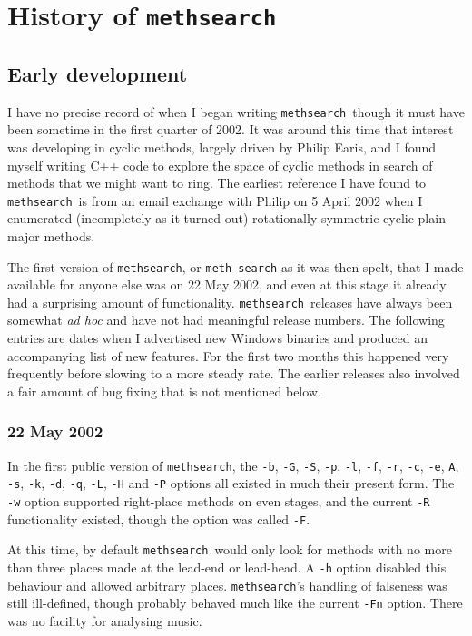 \documentclass[a4paper,11pt,oneside]{book}
\def\methsearch{\texttt{meth\-search}}
\begin{document}
\chapter{History of \methsearch}

\section{Early development}

I have no precise record of when I began writing \methsearch\ though it 
must have been sometime in the first quarter of 2002.  It was around
this time that interest was developing in cyclic methods, largely
driven by Philip Earis, and I found 
myself writing C++ code to explore the space of cyclic methods in search 
of methods that we might want to ring.  The earliest reference I have 
found to \methsearch\ is from an email exchange with Philip on 5 April 2002
when I enumerated (incompletely as it turned out) rotationally-symmetric
cyclic plain major methods.  

The first version of \methsearch, or \texttt{meth-search} as it was then spelt, 
that I made available for anyone else was on 22 May 2002, and even at this 
stage it already had a surprising amount of functionality.  \methsearch\ 
releases have always been somewhat \textit{ad hoc} and have not had 
meaningful release numbers.  The following entries are dates when I 
advertised new Windows binaries and produced an accompanying list of new
features.  For the first two months this happened very frequently before
slowing to a more steady rate.  The earlier releases also involved a fair
amount of bug fixing that is not mentioned below.

\subsection{22 May 2002}

In the first public version of \methsearch,
the \verb+-b+, \verb+-G+, \verb+-S+, \verb+-p+, \verb+-l+, \verb+-f+, 
\verb+-r+, \verb+-c+, \verb+-e+, \verb+A+, \verb+-s+, \verb+-k+, \verb+-d+, 
\verb+-q+, \verb+-L+, \verb+-H+ and \verb+-P+ options all existed in 
much their present form.
The \verb+-w+ option supported right-place methods on even stages, and
the current \verb+-R+ functionality existed, though the option was called
\verb+-F+. 

At this time, by default \methsearch\ would only look for methods with
no more than three places made at the lead-end or lead-head.  A \verb+-h+
option disabled this behaviour and allowed arbitrary places.  
\methsearch's handling of falseness was still ill-defined, though probably
behaved much like the current \verb+-Fn+ option.  There was no facility 
for analysing music.
\end{document}
